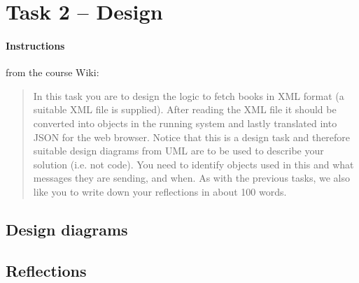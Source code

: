 %
%
%
%


\section{Task 2 -- Design}\label{task-2}

\paragraph{Instructions}\label{task-2-instructions}
from the course Wiki\cite{1dv600:lab2:instructions}:

\begin{quote}
  In this task you are to design the logic to fetch books in XML format (a
  suitable XML file is supplied). After reading the XML file it should be
  converted into objects in the running system and lastly translated into JSON
  for the web browser.
  Notice that this is a design task and therefore suitable design diagrams from
  UML are to be used to describe your solution (i.e. not code). You need to
  identify objects used in this and what messages they are sending, and when.
  As with the previous tasks, we also like you to write down your reflections
  in about 100 words.
\end{quote}


\subsection{Design diagrams}\label{task-2-design}

%
%       
%       
%       



\subsection{Reflections}\label{task-2-reflect}
%

